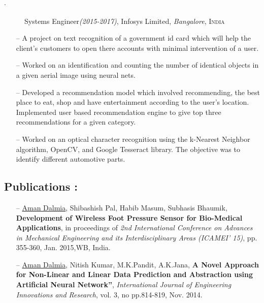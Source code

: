 \documentclass[8pt]{article}
\begin{document}
\begin{description}
\item [$\cdot$ ] Systems Engineer\textit{(2015-2017)}, Infosys Limited, \textit{Bangalore}, \textsc{India} 
\end{description}

\begin{itemize} 
\item[--] A project on text recognition of a government id card which will help the client's customers to open there accounts with minimal intervention of a user.
\item[--] Worked on an identification and counting the number of identical objects in a given aerial image using neural nets. 
\item[--] Developed a recommendation model which involved recommending, the best place to eat, shop and have entertainment according to the user's location. Implemented user based recommendation engine to give top three recommendations for a given category.
\item[--] Worked on an optical character recognition using the k-Nearest Neighbor algorithm, OpenCV, and Google Tesseract library. The objective was to identify different automotive parts.
\end{itemize}


\vspace{-4mm}

\subsection*{Publications :}
\vspace{-0.2cm}
\begin{itemize}
\item[--]\underline{Aman Dalmia}, Shibashish Pal, Habib Masum, Subhasis Bhaumik, \textbf{Development of Wireless Foot Pressure Sensor for Bio-Medical Applications}, in proceedings of \textit {2nd International Conference on Advances in Mechanical Engineering and its Interdisciplinary Areas (ICAMEI’ 15)}, pp. 355-360, Jan. 2015,WB, India.
\item[--]\underline{Aman Dalmia}, Nitish Kumar, M.K.Pandit, A.K.Jana, \textbf{A Novel Approach for Non-Linear and Linear Data Prediction and Abstraction using Artificial Neural Network”}, \textit {International Journal of Engineering Innovations and Research}, vol. 3, no pp.814-819, Nov. 2014.
\end{itemize}
\end{document}
